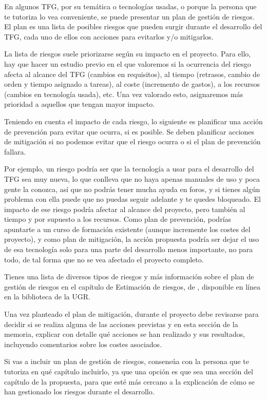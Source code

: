 En algunos TFG, por su temática o tecnologías usadas, o porque la persona que te tutoriza lo vea conveniente, se puede presentar un plan de gestión de riesgos. El plan es una lista de posibles riesgos que pueden surgir durante el desarrollo del TFG, cada uno de ellos con acciones para evitarlos y/o mitigarlos. 

La lista de riesgos suele priorizarse según su impacto en el proyecto. Para ello, hay que hacer un estudio previo en el que valoremos si la ocurrencia del riesgo afecta al alcance del TFG (cambios en requisitos), al tiempo (retrasos, cambio de orden y tiempo asignado a tareas), al coste (incremento de gastos), a los recursos (cambios en tecnología usada), etc. Una vez valorado esto, asignaremos más prioridad a aquellos que tengan mayor impacto. 

Teniendo en cuenta el impacto de cada riesgo, lo siguiente es planificar una acción de prevención para evitar que ocurra, si es posible. Se deben planificar acciones de mitigación si no podemos evitar que el riesgo ocurra o si el plan de prevención fallara.

Por ejemplo, un riesgo podría ser que la tecnología a usar para el desarrollo del TFG sea muy nueva, lo que conlleva que no haya apenas manuales de uso y poca gente la conozca, así que no podrás tener mucha ayuda en foros, y  si tienes algún problema con ella puede que no puedas seguir adelante y te quedes bloqueado. El impacto de ese riesgo podría afectar al alcance del proyecto, pero también al tiempo y por supuesto a los recursos. Como plan de prevención, podrías apuntarte a un curso de formación existente (aunque incremente los costes del proyecto), y como plan de mitigación, la acción propuesta podría ser dejar el uso de esa tecnología solo para una parte del desarrollo menos importante, no para todo, de tal forma que no se vea afectado el proyecto completo.

Tienes una lista de diversos tipos de riesgos y más información sobre el plan de gestión de riesgos en el capítulo de Estimación de riesgos, de \cite{guerin2018gestion}, disponible en línea en la biblioteca de la UGR.

Una vez planteado el plan de mitigación, durante el proyecto debe revisarse para decidir si se realiza alguna de las acciones previstas y en esta sección de la memoria, explicar con detalle qué acciones se han realizado y sus resultados, incluyendo comentarios sobre los costes asociados.

Si vas a incluir un plan de gestión de riesgos, consensúa con la persona que te tutoriza en qué capítulo incluirlo, ya que una opción es que sea una sección del capítulo de la propuesta, para que esté más cercano a la explicación de  cómo se han gestionado los riesgos durante el desarrollo.

